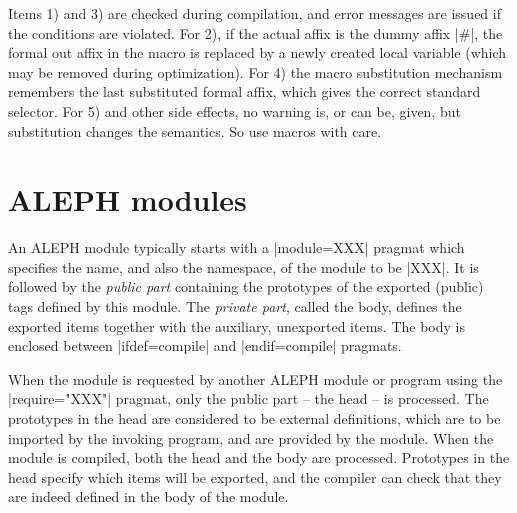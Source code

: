 \documentclass{article}
\newcommand\A{\textsf{ALEPH}}
\gdef\mkbold{\catcode`\'\active\def'##1'{\char39\relax{\bt##1}\char39\relax}%
\catcode`\,\active\def,{\char44\relax}%
\catcode`\<\active\def<{\char60\relax}%
\catcode`\>\active\def>{\char62\relax}%
\catcode`\$=12\catcode`\#=12\catcode`\^=12%
\catcode`\ \active\def {\nobreakspace}}}
\newenvironment{program}{%
\ignorespaces
\par\vskip 3pt plus 2pt minus 2pt\par
\parindent=0pt\tt
\catcode`\$=12\catcode`\^=12
\mkbold
\obeylines
\leftskip \programindent
\baselineskip=0.9\baselineskip
\everypar\expandafter{\the\everypar\unpenalty}%
}{\vskip 2pt plus 2pt minus 2pt\par}
{\catcode`\'=\active\catcode`\ =\active\catcode`\,=\active\catcode`\_=\active%
\catcode`\$=12\catcode`\^=12\catcode`\|=\active\catcode`\<\active\catcode`\>\active%
\gdef\pp#1{\relax\begingroup
\catcode`\$=12\catcode`\~=12\catcode`\^=12%
\catcode`\|\active\let|\endgroup
\catcode`\ \active\def {\space}%
\catcode`\'\active\def'##1'{\char39\relax{\bt##1}\char39\relax}%
\catcode`\_\active\def_{\kern 0.03em\rule{0.3em}{1pt}\kern 0.03em}%
\catcode`\<\active\def<{\char60\relax}%
\catcode`\>\active\def>{\char62\relax}%
\catcode`\#=12\catcode`\^=12%
\tt
}%
}
{\catcode`\[=\active\catcode`\]=\active\catcode`\*=\active%
\gdef\mkoptions{\catcode`\[\active\def[{\kern0.05em\char91\kern0.12em\relax}%
\catcode`\]\active\def]{\kern0.1em\char93\kern0.05em\relax}%
\catcode`\*\active\def*{\kern 0.05em\raisebox{-0.5ex}{\char42}\relax}
}}%
\begin{document}
Items 1) and 3) are checked during compilation, and error messages are
issued if the conditions are violated. For 2), if the actual affix is the dummy
affix \pp|\#|, the formal out affix in the macro is replaced by a newly
created local variable
(which may be removed during optimization). For 4) the macro substitution
mechanism remembers the last substituted formal affix, which gives the
correct standard selector. For 5) and other side effects, no warning is, or
can be, given, but substitution changes the semantics. So use macros with
care.


\section{\A{} modules}\label{section:module}

An \A{} module typically starts with a \pp|module=XXX| pragmat which
specifies the name, and also the namespace, of the module to be \pp|XXX|. It
is followed by the \emph{public part} containing the prototypes of the
exported (public) tags defined by this module. The \emph{private part},
called the body, defines the exported items together with the auxiliary,
unexported items. The body is enclosed between \pp|ifdef=compile| and
\pp|endif=compile| pragmats.

When the module is requested by another \A{} module or program using the
\pp|require="XXX"| pragmat, only the public part -- the head -- is
processed. The prototypes in the head are considered to be external
definitions, which are to be imported by the invoking program, and are
provided by the module. When the module is compiled, both the head and the
body are processed. Prototypes in the head specify which items will be
exported, and the compiler can check that they are indeed defined in the
body of the module.
\end{document}
